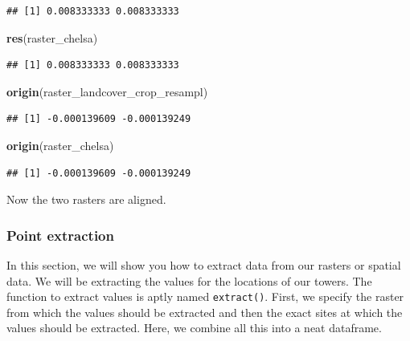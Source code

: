 \documentclass[
]{book}
\newenvironment{Shaded}{\begin{snugshade}}{\end{snugshade}}
\newcommand{\KeywordTok}[1]{\textcolor[rgb]{0.13,0.29,0.53}{\textbf{#1}}}
\newcommand{\NormalTok}[1]{#1}
\begin{document}
\begin{verbatim}
## [1] 0.008333333 0.008333333
\end{verbatim}

\begin{Shaded}
\begin{Highlighting}[]
\KeywordTok{res}\NormalTok{(raster_chelsa)}
\end{Highlighting}
\end{Shaded}

\begin{verbatim}
## [1] 0.008333333 0.008333333
\end{verbatim}

\begin{Shaded}
\begin{Highlighting}[]
\KeywordTok{origin}\NormalTok{(raster_landcover_crop_resampl)}
\end{Highlighting}
\end{Shaded}

\begin{verbatim}
## [1] -0.000139609 -0.000139249
\end{verbatim}

\begin{Shaded}
\begin{Highlighting}[]
\KeywordTok{origin}\NormalTok{(raster_chelsa)}
\end{Highlighting}
\end{Shaded}

\begin{verbatim}
## [1] -0.000139609 -0.000139249
\end{verbatim}

Now the two rasters are aligned.

\hypertarget{point-extraction}{%
\subsubsection{Point extraction}\label{point-extraction}}

In this section, we will show you how to extract data from our rasters or spatial data. We will be extracting the values for the locations of our towers. The function to extract values is aptly named \texttt{extract()}. First, we specify the raster from which the values should be extracted and then the exact sites at which the values should be extracted. Here, we combine all this into a neat dataframe.
\end{document}
